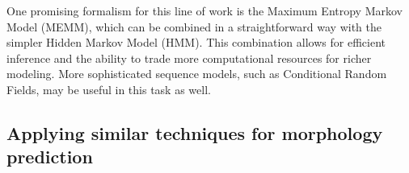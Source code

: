 One promising formalism for this line of work is the Maximum
Entropy Markov Model (MEMM), which can be combined in a straightforward way
with the simpler Hidden Markov Model (HMM). This combination allows for
efficient inference and the ability to trade more computational resources for
richer modeling. More sophisticated sequence models, such as Conditional Random
Fields, may be useful in this task as well.


\subsection{Applying similar techniques for morphology prediction}
